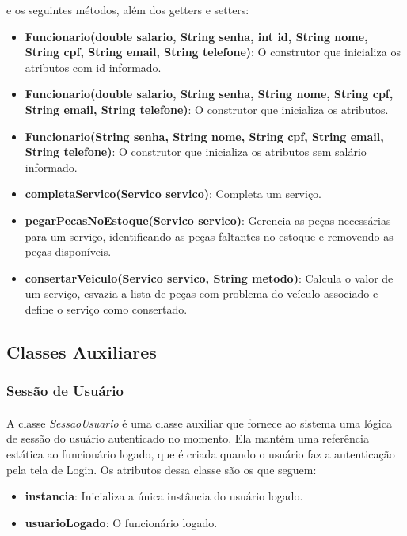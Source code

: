 \documentclass[a4paper,12pt]{article}
\begin{document}
\noindent e os seguintes métodos, além dos getters e setters:

\begin{itemize}[noitemsep]
    \item \textbf{Funcionario(double salario, String senha, int id, String nome, String cpf, String email, String telefone)}: O construtor que inicializa os atributos com id informado.
    \item \textbf{Funcionario(double salario, String senha, String nome, String cpf, String email, String telefone)}: O construtor que inicializa os atributos.
    \item \textbf{Funcionario(String senha, String nome, String cpf, String email, String telefone)}: O construtor que inicializa os atributos sem salário informado.
    \item \textbf{completaServico(Servico servico)}: Completa um serviço.
    \item \textbf{pegarPecasNoEstoque(Servico servico)}: Gerencia as peças necessárias para um serviço, identificando as peças faltantes no estoque e removendo as peças disponíveis.
    \item \textbf{consertarVeiculo(Servico servico, String metodo)}: Calcula o valor de um serviço, esvazia a lista de peças com problema do veículo associado e define o serviço como consertado.
\end{itemize}

\subsection{Classes Auxiliares}

\subsubsection{Sessão de Usuário}
\paragraph{}
A classe \textit{SessaoUsuario} é uma classe auxiliar que fornece ao sistema uma lógica de sessão do usuário autenticado no momento. Ela mantém uma referência estática ao funcionário logado, que é criada quando o usuário faz a autenticação pela tela de Login. Os atributos dessa classe são os que seguem:

\begin{itemize}[noitemsep]
    \item \textbf{instancia}: Inicializa a única instância do usuário logado.
    \item \textbf{usuarioLogado}: O funcionário logado.
\end{itemize}
\end{document}
